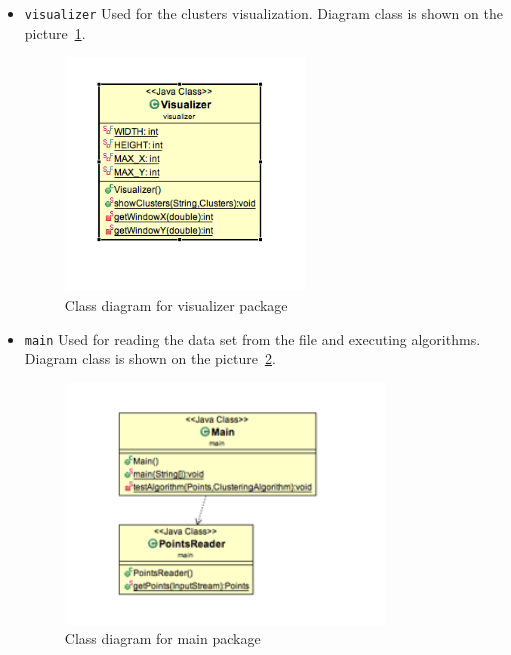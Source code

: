 \documentclass[12pt, a4paper, notitlepage, oneside]{article}
\begin{document}
\begin{itemize}
	\item \texttt{visualizer} Used for the clusters visualization. Diagram class is shown on the picture~\ref{visualizer}.

	\begin{figure}[!ht]
 	\centering
	\includegraphics[width=0.6\textwidth]{images/visualizer_package.png}
 	\caption[]
	{Class diagram for visualizer package}
\label{visualizer}
	\end{figure}


	\item \texttt{main} Used for reading the data set from the file and executing algorithms. Diagram class is shown on the picture~\ref{main}.


	\begin{figure}[!ht]
 	\centering
	\includegraphics[width=0.8\textwidth]{images/main_package.png}
 	\caption[]
	{Class diagram for main package}
\label{main}
	\end{figure}

\end{itemize}
\end{document}
